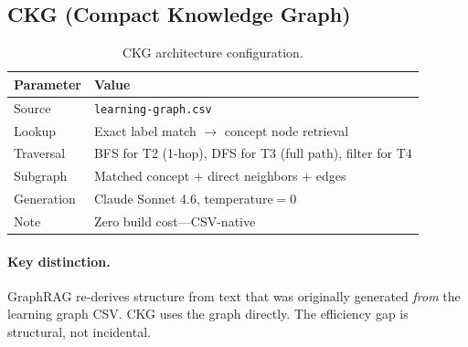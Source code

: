 \subsection{CKG (Compact Knowledge Graph)}\label{sec:arch-ckg}

\begin{table}[htbp]
\centering
\caption{CKG architecture configuration.}
\label{tab:ckg-config}
\begin{tabular}{ll}
\toprule
\textbf{Parameter} & \textbf{Value} \\
\midrule
Source & \texttt{learning-graph.csv} \\
Lookup & Exact label match $\rightarrow$ concept node retrieval \\
Traversal & BFS for T2 (1-hop), DFS for T3 (full path), filter for T4 \\
Subgraph & Matched concept + direct neighbors + edges \\
Generation & Claude Sonnet 4.6, temperature$=$0 \\
Note & Zero build cost---CSV-native \\
\bottomrule
\end{tabular}
\end{table}

\paragraph{Key distinction.}
GraphRAG re-derives structure from text that was originally generated
\textit{from} the learning graph CSV. CKG uses the graph directly. The
efficiency gap is structural, not incidental.
